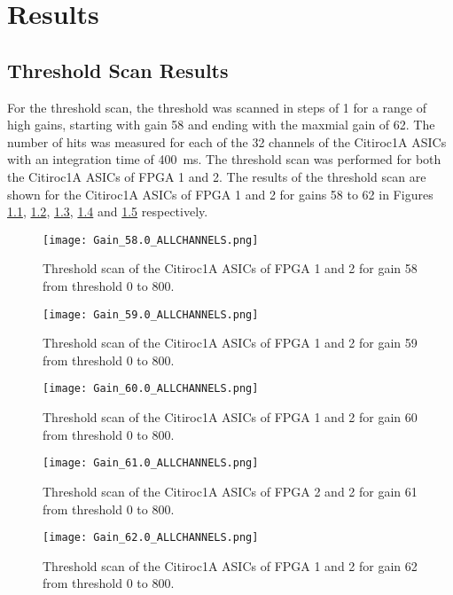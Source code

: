 \chapter{Results}\label{cha:results}
\section{Threshold Scan Results}
For the threshold scan, the threshold was scanned in steps of 1 for a range of high gains,
starting with gain 58 and ending with the maxmial gain of 62.
\newline
The number of hits was measured for each of the 32 channels of the Citiroc1A ASICs with an integration time of \SI{400}{\milli\second}.
The threshold scan was performed for both the Citiroc1A ASICs of FPGA 1 and 2.
\newline
The results of the threshold scan are shown for the Citiroc1A ASICs of FPGA 1 and 2 for gains 58 to 62 in Figures \ref{fig:threshold_scan_58}, \ref{fig:threshold_scan_59}, \ref{fig:threshold_scan_60}, \ref{fig:threshold_scan_61} and \ref{fig:threshold_scan_62} respectively.

    \begin{figure}
        \centering
        \texttt{[image: Gain\_58.0\_ALLCHANNELS.png]}
        \caption{Threshold scan of the Citiroc1A ASICs of FPGA 1 and 2 for gain 58 from threshold 0 to 800.}
        \label{fig:threshold_scan_58}
    \end{figure}
    
    \begin{figure}
        \centering
        \texttt{[image: Gain\_59.0\_ALLCHANNELS.png]}
        \caption{Threshold scan of the Citiroc1A ASICs of FPGA 1 and 2 for gain 59 from threshold 0 to 800.}
        \label{fig:threshold_scan_59}
    \end{figure}
    
    \begin{figure}
        \centering
        \texttt{[image: Gain\_60.0\_ALLCHANNELS.png]}
        \caption{Threshold scan of the Citiroc1A ASICs of FPGA 1 and 2 for gain 60 from threshold 0 to 800.}
        \label{fig:threshold_scan_60}
    \end{figure}
    
    \begin{figure}
        \centering
        \texttt{[image: Gain\_61.0\_ALLCHANNELS.png]}
        \caption{Threshold scan of the Citiroc1A ASICs of FPGA 2 and 2 for gain 61 from threshold 0 to 800.}
        \label{fig:threshold_scan_61}
    \end{figure}
    
    \begin{figure}
        \centering
        \texttt{[image: Gain\_62.0\_ALLCHANNELS.png]}
        \caption{Threshold scan of the Citiroc1A ASICs of FPGA 1 and 2 for gain 62 from threshold 0 to 800.}
        \label{fig:threshold_scan_62}
    \end{figure}
    

     
